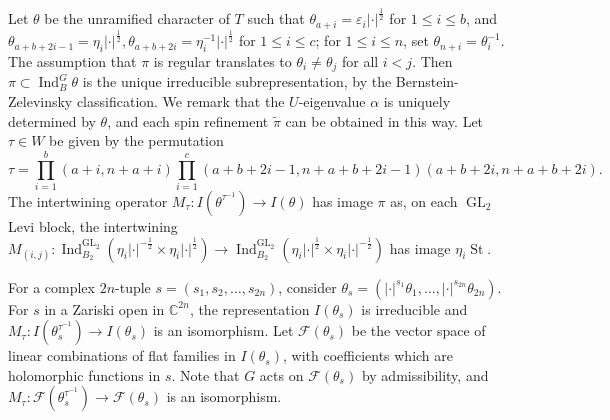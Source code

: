 \documentclass{amsart}
\theoremstyle{definition}
\newcommand{\St}{\operatorname{St}}
\newcommand{\Ind}{\operatorname{Ind}}
\newcommand{\GL}{\operatorname{GL}}
\begin{document}
{Let $\theta$ be the unramified character of $T$ such that 
$\theta_{a+i}=\varepsilon_i|\cdot|^{\frac{1}{2}}$ for $1\leqslant i\leqslant b$, and
$\theta_{a+b+2i-1}=\eta_i|\cdot|^{\frac{1}{2}},
\theta_{a+b+2i}=\eta_i^{-1}|\cdot|^{\frac{1}{2}}$ for $1\leqslant i\leqslant c$; 
for $1\leqslant i\leqslant n$, set $\theta_{n+i}=\theta_i^{-1}$. The
assumption that $\pi$ is regular translates to
$\theta_i\neq\theta_j$ for all $i<j$. Then $\pi\subset\Ind_B^G\theta$ is the unique irreducible subrepresentation, by the Bernstein-Zelevinsky classification. We remark that the $U$-eigenvalue $\alpha$ is uniquely determined by $\theta$, and each spin refinement $\widetilde{\pi}$ can be obtained in this way.
Let $\tau\in W$ be given by the permutation
\begin{equation}
\tau=\prod_{i=1}^b(a+i,n+a+i)\prod_{i=1}^c(a+b+2i-1,n+a+b+2i-1)(a+b+2i,n+a+b+2i).
\end{equation}
The intertwining operator $M_\tau:I(\theta^{\tau^{-1}})\to I(\theta)$ has image $\pi$ as, on each $\GL_2$ Levi
block, the intertwining $M_{(i,j)}:\Ind_{B_2}^{\GL_2}(\eta_i|\cdot|^{-\frac{1}{2}} \times\eta_i|\cdot|^{\frac{1}{2}})\to
\Ind_{B_2}^{\GL_2}(\eta_i|\cdot|^{\frac{1}{2}} \times\eta_i|\cdot|^{-\frac{1}{2}})$ has image $\eta_i\St$. 

For a complex $2n$-tuple $s=(s_1,s_2,\ldots,s_{2n})$, consider $\theta_s= (|\cdot|^{s_1}\theta_1, \dots, |\cdot|^{s_{2n}}\theta_{2n})$. For $s$ in a Zariski open in $\mathbb{C}^{2n}$, the representation $I(\theta_s)$ is irreducible and $M_\tau:I(\theta_s^{\tau^{-1}})\to I(\theta_s)$ is an isomorphism. Let $\mathcal{F}(\theta_s)$ be the vector space of linear combinations of flat families in $I(\theta_s)$, with coefficients which are holomorphic functions in $s$. Note that $G$ acts on $\mathcal{F}(\theta_s)$ by admissibility, and $M_\tau:\mathcal{F}(\theta_s^{\tau^{-1}})\to \mathcal{F}(\theta_s)$ is an isomorphism. 

}
\end{document}
